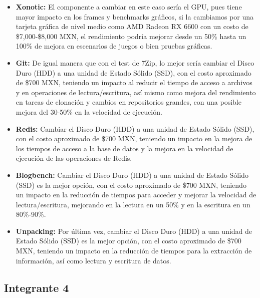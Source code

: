 \documentclass[12pt]{article}
\begin{document}
\begin{enumerate}[label=(\arabic{section}.\arabic{subsection}.\arabic{enumi})]
\begin{itemize}
    	\item \textbf{Xonotic:} El componente a cambiar en este caso sería el GPU, pues tiene mayor impacto en los frames y benchmarks gráficos, si la cambiamos por una tarjeta gráfica de nivel medio como AMD Radeon RX 6600 con un costo de \$7,000-\$8,000 MXN, el rendimiento podría mejorar desde un 50\% hasta un 100\% de mejora en escenarios de juegos o bien pruebas gráficas.
    	
    	\item \textbf{Git:} De igual manera que con el test de 7Zip, lo mejor sería cambiar el Disco Duro (HDD) a una unidad de Estado Sólido (SSD), con el costo aproximado de \$700 MXN, teniendo un impacto al reducir el tiempo de acceso a archivos y en operaciones de lectura/escritura, así mismo como mejora del rendimiento en tareas de clonación y cambios en repositorios grandes, con una posible mejora del 30-50\% en la velocidad de ejecución.
    	
    	\item \textbf{Redis:} Cambiar el Disco Duro (HDD) a una unidad de Estado Sólido (SSD), con el costo aproximado de \$700 MXN, teniendo un impacto en la mejora de los tiempos de acceso a la base de datos y la mejora en la velocidad de ejecución de las operaciones de Redis.
    	
    	\item \textbf{Blogbench:} Cambiar el Disco Duro (HDD) a una unidad de Estado Sólido (SSD) es la mejor opción, con el costo aproximado de \$700 MXN, teniendo un impacto en la reducción de tiempos para acceder y mejorar la velocidad de lectura/escritura, mejorando en la lectura en un 50\% y en la escritura en un 80\%-90\%.
    	
    	\item \textbf{Unpacking:} Por última vez, cambiar el Disco Duro (HDD) a una unidad de Estado Sólido (SSD) es la mejor opción, con el costo aproximado de \$700 MXN, teniendo un impacto en la reducción de tiempos para la extracción de información, así como lectura y escritura de datos.
    \end{itemize}

\end{enumerate}

\subsection{Integrante 4}
\end{document}
